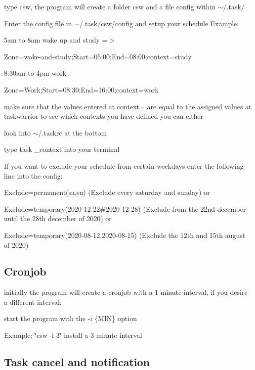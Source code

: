 \begin{DoxyItemize}
\item type csw, the program will create a folder csw and a file config within $\sim$/.task/
\item Enter the config file in $\sim$/.task/csw/config and setup your schedule Example\+:
\begin{DoxyItemize}
\item 5am to 8am wake up and study =$>$
\item Zone=wake-\/and-\/study;Start=05\+:00;End=08\+:00;context=study
\item 8\+:30am to 4pm work
\item Zone=Work;Start=08\+:30;End=16\+:00;context=work
\end{DoxyItemize}
\item make sure that the values entered at \textquotesingle{}context=\textquotesingle{} are equal to the assigned values at taskwarrior to see which contexts you have defined you can either
\begin{DoxyItemize}
\item look into $\sim$/.taskrc at the bottom
\item type task \+\_\+context into your terminal
\end{DoxyItemize}
\item If you want to exclude your schedule from certain weekdays enter the following line into the config\+:
\begin{DoxyItemize}
\item Exclude=permanent(sa,su) (Exclude every saturday and sunday) or
\item Exclude=temporary(2020-\/12-\/22\#2020-\/12-\/28) (Exclude from the 22nd december until the 28th december of 2020) or
\item Exclude=temporary(2020-\/08-\/12,2020-\/08-\/15) (Exclude the 12th and 15th august of 2020)
\end{DoxyItemize}
\end{DoxyItemize}\hypertarget{index_cronjob}{}\subsection{Cronjob}\label{index_cronjob}

\begin{DoxyItemize}
\item initially the program will create a cronjob with a 1 minute interval, if you desire a different interval\+:
\begin{DoxyItemize}
\item start the program with the -\/i \{M\+IN\} option
\item Example\+: \char`\"{}csw -\/i 3\char`\"{} install a 3 minute interval
\end{DoxyItemize}
\end{DoxyItemize}\hypertarget{index_cancel-notify}{}\subsection{Task cancel and notification}\label{index_cancel-notify}

